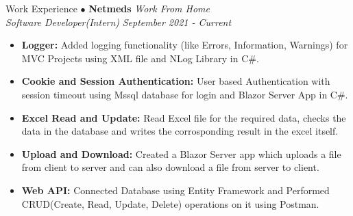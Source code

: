 \begin{rSection}{Work Experience}
    $\bullet$ \textbf{Netmeds} \hfill {\em Work From Home}\\
    {\em Software Developer(Intern)} \hfill{\em September 2021 - Current}\\
    \begin{itemize}
        \item \textbf{Logger:} Added logging functionality (like Errors, Information, Warnings) for MVC Projects using XML file and NLog Library in C\#.
        \item \textbf{Cookie and Session Authentication:} User based Authentication with session timeout using Mssql database for login and Blazor Server App in C\#.
        \item \textbf{Excel Read and Update:} Read Excel file for the required data, checks the data in the database and writes the corrosponding result in the excel itself.
        \item \textbf{Upload and Download:} Created a Blazor Server app which uploads a file from client to server and can also download a file from server to client.
        \item \textbf{Web API:} Connected Database using Entity Framework and Performed CRUD(Create, Read, Update, Delete) operations on it using Postman.
    \end{itemize}
\end{rSection}